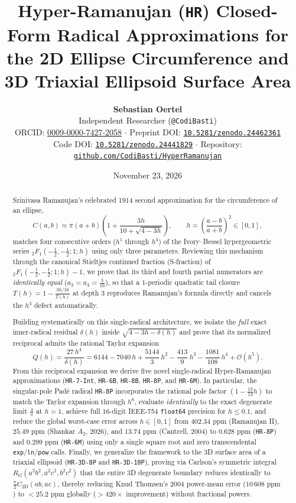 \documentclass[11pt,a4paper]{article}
\title{\textbf{Hyper-Ramanujan (\texttt{HR}) Closed-Form Radical Approximations for the 2D Ellipse Circumference and 3D Triaxial Ellipsoid Surface Area}}
\author{
    \textbf{Sebastian Oertel}\\
    Independent Researcher (\texttt{@CodiBasti})\\
    ORCID: \href{https://orcid.org/0009-0000-7427-2058}{0009-0000-7427-2058} $\cdot$ Preprint DOI: \href{https://doi.org/10.5281/zenodo.24462361}{\texttt{10.5281/zenodo.24462361}}\\
    Code DOI: \href{https://doi.org/10.5281/zenodo.24441829}{\texttt{10.5281/zenodo.24441829}} $\cdot$ Repository: \href{https://github.com/CodiBasti/HyperRamanujan}{\texttt{github.com/CodiBasti/HyperRamanujan}}
}
\date{November 23, 2026}
\theoremstyle{spacious}
\theoremstyle{spaciousdef}
\begin{document}
\maketitle

\begin{abstract}
\noindent
Srinivasa Ramanujan's celebrated 1914 second approximation for the circumference of an ellipse,
\[
C(a,b) \approx \pi(a+b)\left(1 + \frac{3h}{10 + \sqrt{4 - 3h}}\right), \qquad h = \left(\frac{a-b}{a+b}\right)^2 \in [0, 1],
\]
matches four consecutive orders ($h^1$ through $h^4$) of the Ivory--Bessel hypergeometric series ${}_2F_1\!\left(-\tfrac{1}{2}, -\tfrac{1}{2}; 1; h\right)$ using only three parameters. Reviewing this mechanism through the canonical Stieltjes continued fraction (S-fraction) of ${}_2F_1\!\left(-\tfrac{1}{2}, -\tfrac{1}{2}; 1; h\right) - 1$, we prove that its third and fourth partial numerators are \emph{identically equal} ($a_3 = a_4 = \tfrac{3}{16}$), so that a $1$-periodic quadratic tail closure $T(h) = 1 - \tfrac{3h/16}{T(h)}$ at depth $3$ reproduces Ramanujan's formula directly and cancels the $h^4$ defect automatically.

Building systematically on this single-radical architecture, we isolate the \emph{full} exact inner-radical residual $\delta(h)$ inside $\sqrt{4 - 3h - \delta(h)}$ and prove that its normalized reciprocal admits the rational Taylor expansion
\[
Q(h) = \frac{27\,h^4}{\delta(h)} = 6144 - 7040\,h + \frac{5144}{3}\,h^2 - \frac{413}{9}\,h^3 - \frac{1081}{108}\,h^4 + \mathcal{O}(h^5).
\]
From this reciprocal expansion we derive five novel single-radical Hyper-Ramanujan approximations (\texttt{HR-7-Int}, \texttt{HR-6B}, \texttt{HR-8B}, \texttt{HR-8P}, and \texttt{HR-6M}). In particular, the singular-pole Pad\'e radical \texttt{HR-8P} incorporates the rational pole factor $\left(1 - \tfrac{13}{14}h\right)$ to match the Taylor expansion through $h^8$, evaluate \emph{identically} to the exact degenerate limit $\tfrac{4}{\pi}$ at $h=1$, achieve full $16$-digit IEEE-754 \texttt{float64} precision for $h \le 0.1$, and reduce the global worst-case error across $h \in [0, 1]$ from $402.34\text{ ppm}$ (Ramanujan II), $25.49\text{ ppm}$ (Shankar $A_2$, 2026), and $13.74\text{ ppm}$ (Cantrell, 2004) to \textbf{$0.628\text{ ppm}$} (\texttt{HR-8P}) and \textbf{$0.299\text{ ppm}$} (\texttt{HR-6M}) using only a single square root and zero transcendental \texttt{exp}/\texttt{ln}/\texttt{pow} calls. Finally, we generalize the framework to the 3D surface area of a triaxial ellipsoid (\texttt{HR-3D-8P} and \texttt{HR-3D-10P}), proving via Carlson's symmetric integral $R_G(a^2b^2, a^2c^2, b^2c^2)$ that the entire 3D degenerate boundary reduces identically to $\tfrac{\pi}{2}C_{\text{2D}}(ab, ac)$, thereby reducing Knud Thomsen's 2004 power-mean error ($10\,608\text{ ppm}$) to \textbf{$< 25.2\text{ ppm}$} globally ($>420\times$ improvement) without fractional powers.
\end{abstract}
\end{document}
